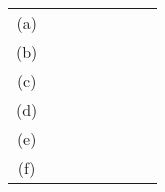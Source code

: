 \begin{table}[]
\begin{tabular}{|c|l|l|l|l|l|l|l|l|l|}
(a)                             &                                                 &                                         &                                         &                                         &                                        &                                         & \multicolumn{3}{l|}{}                                                                                                    \\ \cline{1-7}
(b)                             &                                                 & \cellcolor[HTML]{C0C0C0}                &                                         &                                         &                                        &                                         & \multicolumn{3}{l|}{}                                                                                                    \\ \cline{1-7}
(c)                             &                                                 & \cellcolor[HTML]{C0C0C0}                &                                         &                                         &                                        &                                         & \multicolumn{3}{l|}{}                                                                                                    \\ \cline{1-7}
(d)                             &                                                 &                                         & \cellcolor[HTML]{C0C0C0}                & \cellcolor[HTML]{C0C0C0}                &                                        &                                         & \multicolumn{3}{l|}{}                                                                                                    \\ \cline{1-7}
(e)                             & \cellcolor[HTML]{C0C0C0}                        &                                         &                                         &                                         & \cellcolor[HTML]{C0C0C0}               &                                         & \multicolumn{3}{l|}{}                                                                                                    \\ \cline{1-7}
(f)                             &                                                 &                                         & \cellcolor[HTML]{C0C0C0}                & \cellcolor[HTML]{C0C0C0}                & \cellcolor[HTML]{C0C0C0}               &                                         & \multicolumn{3}{l|}{}                                                                                                    \\ \cline{1-7}

\end{tabular}
\end{table}
